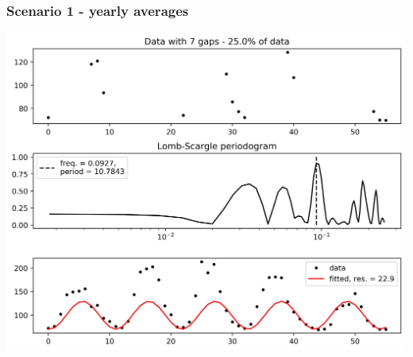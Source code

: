 \documentclass{beamer}
\begin{document}
\begin{frame}
\frametitle{Scenario 1 - yearly averages}
\begin{center}
\includegraphics[scale=0.55]{../scripts/dataset3/periodograms_ny2.0_model2_Ng7.jpg}
\end{center}
\end{frame}
\end{document}
